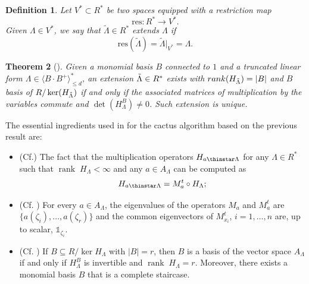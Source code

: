 \documentclass[a4paper,11p]{amsart}
\newtheorem{defn0}{Definition}[section]
\newtheorem{thm0}[defn0]{Theorem}
\newenvironment{definition}{ \begin{defn0}}{\end{defn0}}
\newenvironment{theorem}{\bigskip \begin{thm0}}{\end{thm0}}
\begin{document}
\begin{definition}
Let $V^* \subset R^*$ be two spaces equipped with a restriction map
\[
\mathrm{res} : R^* \longrightarrow V^*.
\]
Given $\Lambda \in V^*$, we say that $\tilde \Lambda \in R^*$ \emph{extends} $\Lambda$ if
\[
\mathrm{res}(\tilde \Lambda) = \tilde \Lambda\big|_{V^*} = \Lambda.
\]
\end{definition}

\begin{theorem}[\cite{Bernard}]
Given a monomial basis $B$ connected to $1$ and a truncated linear form $\Lambda\in \langle B\cdot B^+\rangle_{\leq d}^*$, an extension $\Tilde{\Lambda}\in R^*$ exists with $rank(H_{\Tilde{\Lambda}})=|B|$ and $B$ basis of $R/\ker(H_{\Tilde{\Lambda}})$ if and only if the associated matrices of multiplication by the variables commute and $\det(H_{\Lambda}^B)\neq 0$. Such extension is unique.
\end{theorem}


The essential ingredients used in \cite{Alessandra} for the cactus algorithm based on the previous result are:

\begin{itemize}
    \item (Cf.\cite{Bernard}) The fact that the multiplication operators $H_{a\thinstar \Lambda}$ for any $\Lambda\in R^*$ such that $\operatorname{rank} \; H_{\Lambda}<\infty$ and any $a\in A_{\Lambda}$ can be computed as
    \begin{equation}\label{MatMult}
    H_{a\thinstar \Lambda}=M_a^t \circ H_{\Lambda};\end{equation} 

    \item 
 (Cf. {\cite[Theorem 4.23]{BernardBook}}) \label{Thm: eigenvaluesMultOperatos}
        For every $a\in A_{\Lambda}$, the eigenvalues of the operators $M_a$ and $M_a^t$ are $\{a(\zeta_i), \ldots, a(\zeta_r)\}$ and the common eigenvectors of $M_{x_i}^t$, $i=1,\ldots,n$ are, up to scalar, $\mathds{1}_{\zeta_i}$.
    \item (Cf. {\cite[Proposition 3.2]{Alessandra}})\label{Prop: BasisInHankel}
    If $B\subseteq R/\ker H_\Lambda$ with $|B|=r$, then $B$ is a basis of the vector space $A_{\Lambda}$ if and only if $H_{\Lambda}^B$ is invertible and $\operatorname{rank} \; H_{\Lambda}=r$. Moreover, there exists a monomial basis $B$ that is a complete staircase.
\end{itemize}
\end{document}

